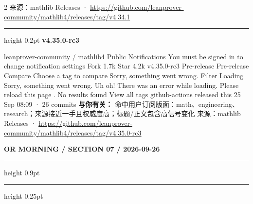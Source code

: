 \documentclass[10.5pt]{ctexart}
\begin{document}
\begin{multicols}{2}
{\footnotesize\color{ormuted} 来源：mathlib Releases · \url{https://github.com/leanprover-community/mathlib4/releases/tag/v4.34.1}}
\vspace{2mm}
\hrule height 0.2pt
\vspace{2mm}
{\large\bfseries v4.35.0-rc3}\par
leanprover-community / mathlib4 Public Notifications You must be signed in to change notification settings Fork 1.7k Star 4.2k v4.35.0-rc3 Pre-release Pre-release Compare Choose a tag to compare Sorry, something went wrong. Filter Loading Sorry, something went wrong. Uh oh! There was an error while loading. Please reload this page . No results found View all tags github-actions released this 25 Sep 08:09 · 26 commits
\textbf{与你有关：} 命中用户订阅版面：math、engineering、research；来源接近一手且权威度高；标题/正文包含高信号变化
{\footnotesize\color{ormuted} 来源：mathlib Releases · \url{https://github.com/leanprover-community/mathlib4/releases/tag/v4.35.0-rc3}}
\end{multicols}
\newpage
{\small\bfseries OR MORNING / SECTION 07 / 2026-09-26}
\vspace{2mm}
\hrule height 0.9pt
\vspace{1.5mm}
\hrule height 0.25pt
\vspace{4mm}
\end{document}
